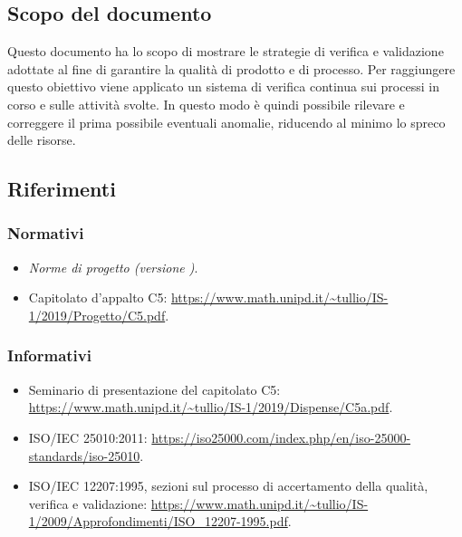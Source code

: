 \documentclass[../piano-di-qualifica.tex]{subfiles}
\begin{document}
\subsection{Scopo del documento}%
\label{sub:scopo_del_documento}
Questo documento ha lo scopo di mostrare le strategie di verifica e validazione adottate al fine di garantire la qualità di prodotto e di processo.
Per raggiungere questo obiettivo viene applicato un sistema di verifica continua sui processi in corso e sulle attività svolte.
In questo modo è quindi possibile rilevare e correggere il prima possibile eventuali anomalie, riducendo al minimo lo spreco delle risorse.


\scopoDelProdottoEGlossario{}

\subsection{Riferimenti}%
\label{sub:riferimenti}
\subsubsection{Normativi}%
\label{par:normativi}
\begin{itemize}
  \item \textit{Norme di progetto (versione \versione)}.
  \item Capitolato d'appalto C5: \href{https://www.math.unipd.it/~tullio/IS-1/2019/Progetto/C5.pdf}{https://www.math.unipd.it/\textasciitilde tullio/IS-1/2019/Progetto/C5.pdf}.
\end{itemize}
\subsubsection{Informativi}%
\label{par:informativi}
\begin{itemize}
  \item Seminario di presentazione del capitolato C5: \href{https://www.math.unipd.it/~tullio/IS-1/2019/Dispense/C5a.pdf}{https://www.math.unipd.it/\textasciitilde tullio/IS-1/2019/Dispense/C5a.pdf}.
  \item ISO/IEC 25010:2011: \href{https://iso25000.com/index.php/en/iso-25000-standards/iso-25010}{https://iso25000.com/index.php/en/iso-25000-standards/iso-25010}.
  \item ISO/IEC 12207:1995, sezioni sul processo di accertamento della qualità, verifica e validazione: \linebreak\href{https://www.math.unipd.it/~tullio/IS-1/2009/Approfondimenti/ISO_12207-1995.pdf}{https://www.math.unipd.it/\textasciitilde tullio/IS-1/2009/Approfondimenti/ISO\_12207-1995.pdf}.
\end{itemize}
\end{document}
